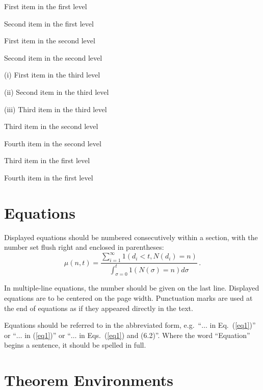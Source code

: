 \documentclass{ws-ijnt}
\begin{document}
\begin{arabiclist}
\item First item in the first level
\item Second item in the first level
\begin{alphlist}[(a)]
\item First item in the second level 
\item Second item in the second level
  \begin{romanlist}[(iii)]  
\item[(i)] First item in the third level 
\item[(ii)] Second item in the third level
\item[(iii)] Third item in the third level
\end{romanlist}
\item Third item in the second level
\item Fourth item in the second level
\end{alphlist}
\item Third item in the first level
\item Fourth item in the first level
\end{arabiclist}

\section{Equations}

Displayed equations should be numbered consecutively within a section,  
with the number set flush right and enclosed in parentheses:
\begin{equation}
\mu(n, t) = \frac{\sum^\infty_{i=1} 1(d_i < t, 
N(d_i) = n)}{\int^t_{\sigma=0} 1(N(\sigma) = n)d\sigma}\,.
\label{eq1}
\end{equation}

In multiple-line equations, the number should be given on the last
line. Displayed equations are to be centered on the page width.  
Punctuation marks are used at the end of equations as if they 
appeared directly in the text.

Equations should be referred to in the abbreviated form, 
e.g.~``$\ldots$ in Eq.~(\ref{eq1})'' or 
``$\ldots$ in (\ref{eq1})'' or 
``$\ldots$ in Eqs.~(\ref{eq1}) and (6.2)''. Where the  
word ``Equation'' begins a sentence, it should be spelled in full.

\section{Theorem Environments\label{sfive}}
\end{document}
